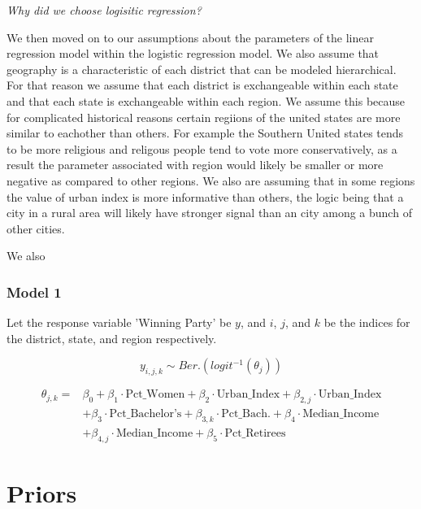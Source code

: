 \documentclass[12pt]{article}
\begin{document}
\textit{Why did we choose logisitic regression?}

We then moved on to our assumptions about the parameters of the linear regression model within the logistic regression model. We also assume that geography is a characteristic of each district that can be modeled hierarchical. For that reason we assume that each district is exchangeable within each state and that each state is exchangeable within each region. We assume this because for complicated historical reasons certain regiions of the united states are more similar to eachother than others. For example the Southern United states tends to be more religious and religous people tend to vote more conservatively, as a result the parameter associated with region would likely be smaller or more negative as compared to other regions. 
We also are assuming that in some regions the value of urban index is more informative than others, the logic being that a city in a rural area will likely have stronger signal than an city among a bunch of other cities. 

We also 


\subsubsection*{Model 1}

Let the response variable 'Winning Party' be \(y\), and \(i\), \(j\), and \(k\) be the indices for the district, state, and region respectively. 

\[y_{i,j,k} \sim Ber.(logit^{-1}(\theta_{j}))\]


\begin{equation}
	\begin{aligned}
		\theta_{j,k} = &\beta_0 + \beta_1 \cdot \text{Pct\_Women} + \beta_2 \cdot \text{Urban\_Index} + \beta_{2,j} \cdot \text{Urban\_Index} \\
		&+ \beta_3 \cdot \text{Pct\_Bachelor's} + \beta_{3,k} \cdot \text{Pct\_Bach.} + \beta_{4} \cdot \text{Median\_Income} \\ 
		&+ \beta_{4,j} \cdot \text{Median\_Income} + \beta_{5} \cdot \text{Pct\_Retirees}
	\end{aligned}
\end{equation}










\section{Priors}
\end{document}
